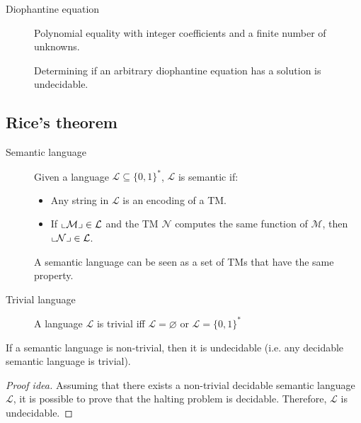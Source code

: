 \begin{description}
    \item[Diophantine equation] 
        Polynomial equality with integer coefficients and a finite number of unknowns.

        \begin{theorem}[MDPR]
            Determining if an arbitrary diophantine equation has a solution is undecidable.
        \end{theorem}
\end{description}



\subsection{Rice's theorem}

\begin{description}
    \item[Semantic language] 
        Given a language $\mathcal{L} \subseteq \{ 0, 1 \}^*$, $\mathcal{L}$ is semantic if:
        \begin{itemize}
            \item Any string in $\mathcal{L}$ is an encoding of a TM.
            \item If ${\llcorner{\mathcal{M}}\lrcorner} \in \mathcal{L}$ and 
                the TM $\mathcal{N}$ computes the same function of $\mathcal{M}$,
                then ${\llcorner{\mathcal{N}}\lrcorner} \in \mathcal{L}$.
        \end{itemize}

        A semantic language can be seen as a set of TMs that have the same property.

    \item[Trivial language]
        A language $\mathcal{L}$ is trivial iff $\mathcal{L} = \varnothing$ or $\mathcal{L} = \{0, 1\}^*$
\end{description}

\begin{theorem} 
    If a semantic language is non-trivial, then it is undecidable
    (i.e. any decidable semantic language is trivial).

    \begin{proof}[Proof idea]
        Assuming that there exists a non-trivial decidable semantic language $\mathcal{L}$, 
        it is possible to prove that the halting problem is decidable.
        Therefore, $\mathcal{L}$ is undecidable.
    \end{proof}
\end{theorem}